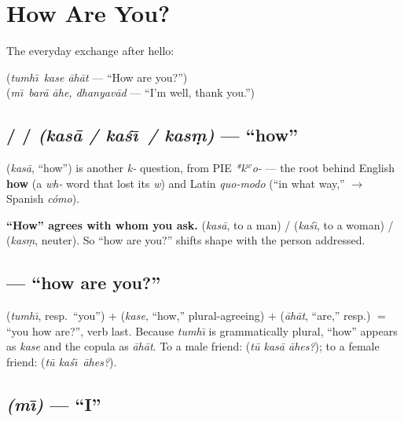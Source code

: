 \chapter{How Are You?}
\label{ch:responding}

The everyday exchange after hello:

\begin{center}
 \quad(\emph{tumh\=\i\ kase \=ah\=at} --- ``How are you?'')\\
 \quad(\emph{m\=\i\ bar\=a \=ahe, dhanyav\=ad} --- ``I'm well, thank you.'')
\end{center}

\section{ /  /  \emph{(kas\=a / ka\'{s}\=\i\ / kas\d{m})} --- ``how''}
\label{lesson:kasa}

\begin{cousinweb}
 (\emph{kas\=a}, ``how'') is another \emph{k-} question, from PIE
\emph{*k\ensuremath{^w}o-} --- the root behind English \textbf{how} (a \emph{wh-}
word that lost its \emph{w}) and Latin \emph{quo-modo} (``in what way,'' $\to$
Spanish \emph{c\'{o}mo}).
\end{cousinweb}

\begin{grammarlens}
\textbf{``How'' agrees with whom you ask.}  (\emph{kas\=a}, to a man) /
 (\emph{ka\'{s}\=\i}, to a woman) /  (\emph{kas\d{m}}, neuter). So
``how are you?'' shifts shape with the person addressed.
\end{grammarlens}

\section{ --- ``how are you?''}
\label{lesson:tumhi-kase-aahat}

 (\emph{tumh\=\i}, resp.\ ``you'') $+$  (\emph{kase}, ``how,''
plural-agreeing) $+$  (\emph{\=ah\=at}, ``are,'' resp.) $=$ ``you how
are?'', verb last. Because \emph{tumh\=\i} is grammatically plural, ``how''
appears as \emph{kase} and the copula as \emph{\=ah\=at}. To a male friend:
 (\emph{t\=u kas\=a \=ahes?}); to a female friend: 
(\emph{t\=u ka\'{s}\=\i\ \=ahes?}).

\section{ \emph{(m\=\i)} --- ``I''}
\label{lesson:mi}

